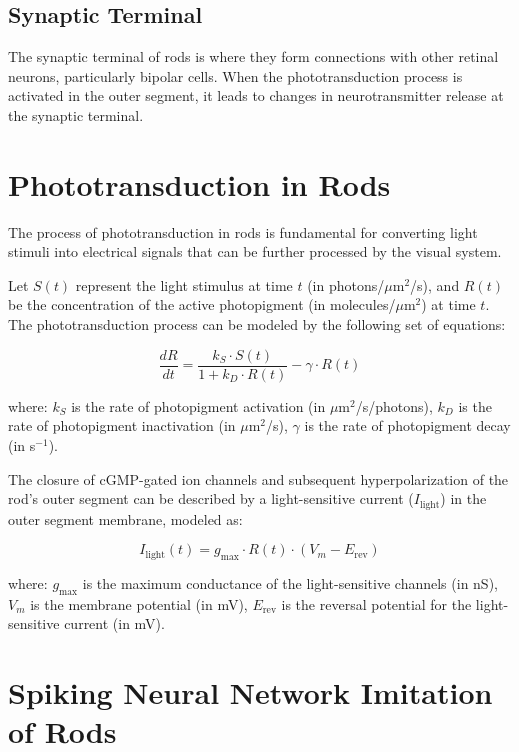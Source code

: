 \documentclass{article}
\begin{document}
\subsection{Synaptic Terminal}

The synaptic terminal of rods is where they form connections with other retinal neurons, particularly bipolar cells. When the phototransduction process is activated in the outer segment, it leads to changes in neurotransmitter release at the synaptic terminal.

\section{Phototransduction in Rods}

The process of phototransduction in rods is fundamental for converting light stimuli into electrical signals that can be further processed by the visual system.

Let $S(t)$ represent the light stimulus at time $t$ (in photons/$\mu$m$^2$/s), and $R(t)$ be the concentration of the active photopigment (in molecules/$\mu$m$^2$) at time $t$. The phototransduction process can be modeled by the following set of equations:

\begin{equation}
\frac{dR}{dt} = \frac{k_S \cdot S(t)}{1 + k_D \cdot R(t)} - \gamma \cdot R(t)
\end{equation}

where:
$k_S$ is the rate of photopigment activation (in $\mu$m$^2$/s/photons),
$k_D$ is the rate of photopigment inactivation (in $\mu$m$^2$/s),
$\gamma$ is the rate of photopigment decay (in s$^{-1}$).

The closure of cGMP-gated ion channels and subsequent hyperpolarization of the rod's outer segment can be described by a light-sensitive current ($I_{\text{light}}$) in the outer segment membrane, modeled as:

\begin{equation}
I_{\text{light}}(t) = g_{\text{max}} \cdot R(t) \cdot (V_m - E_{\text{rev}})
\end{equation}

where:
$g_{\text{max}}$ is the maximum conductance of the light-sensitive channels (in nS),
$V_m$ is the membrane potential (in mV),
$E_{\text{rev}}$ is the reversal potential for the light-sensitive current (in mV).

\section{Spiking Neural Network Imitation of Rods}
\end{document}
